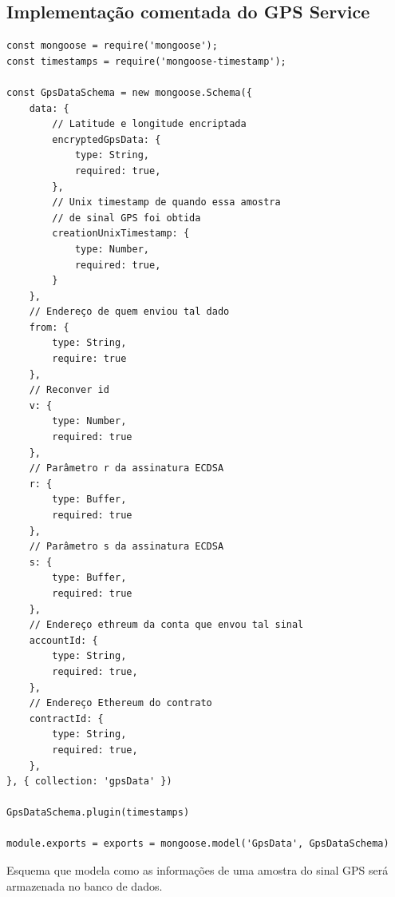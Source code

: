 \subsection{Implementação comentada do GPS Service}

\begin{code}
\begin{verbatim}
const mongoose = require('mongoose');
const timestamps = require('mongoose-timestamp');

const GpsDataSchema = new mongoose.Schema({
    data: {
        // Latitude e longitude encriptada
        encryptedGpsData: { 
            type: String,
            required: true,
        },
        // Unix timestamp de quando essa amostra
        // de sinal GPS foi obtida
        creationUnixTimestamp: {   
            type: Number,
            required: true,
        }
    },
    // Endereço de quem enviou tal dado
    from: {
        type: String,
        require: true
    },
    // Reconver id
    v: {
        type: Number,
        required: true
    },
    // Parâmetro r da assinatura ECDSA
    r: {
        type: Buffer,
        required: true
    },
    // Parâmetro s da assinatura ECDSA
    s: {
        type: Buffer,
        required: true
    },
    // Endereço ethreum da conta que envou tal sinal
    accountId: {
        type: String,
        required: true,
    },
    // Endereço Ethereum do contrato
    contractId: {
        type: String,
        required: true,
    },
}, { collection: 'gpsData' })

GpsDataSchema.plugin(timestamps)

module.exports = exports = mongoose.model('GpsData', GpsDataSchema)
\end{verbatim}
\caption{Esquema que modela como as informações de uma amostra do sinal GPS será armazenada no banco de dados.}
\label{lst:gps_data_schema}
\end{code}

